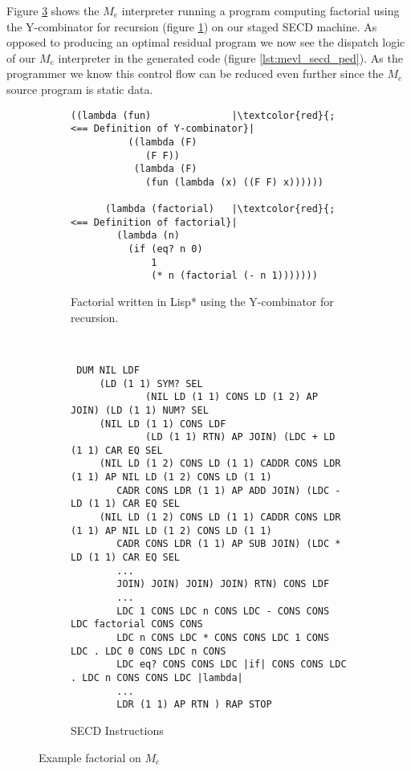 \documentclass[a4paper,12pt,twoside,openright]{report}
\theoremstyle{definition}
\newcommand{\mevl}{$M_{e}$}
\begin{document}
Figure \ref{lst:mevl_secd_all} shows the \mevl{} interpreter running a program computing factorial using the Y-combinator for recursion (figure \ref{lst:mevl_secd_lisp}) on our staged SECD machine. As opposed to producing an optimal residual program we now see the dispatch logic of our \mevl{} interpreter in the generated code (figure \ref{lst:mevl_secd_ped}). As the programmer we know this control flow can be reduced even further since the \mevl{} source program is static data.


\begin{figure}[htp!]
\centering
    \begin{subfigure}{.5\linewidth}
         \centering
         \begin{verbatim}
((lambda (fun)              |\textcolor{red}{;<== Definition of Y-combinator}|
          ((lambda (F)
             (F F))
           (lambda (F)
             (fun (lambda (x) ((F F) x))))))

      (lambda (factorial)   |\textcolor{red}{;<== Definition of factorial}|
        (lambda (n)
          (if (eq? n 0)
              1
              (* n (factorial (- n 1)))))))
         \end{verbatim}
         \caption{Factorial written in Lisp* using the Y-combinator for recursion.}
         \label{lst:mevl_secd_lisp}
    \end{subfigure}\\[1ex]
    \par\bigskip
    \begin{subfigure}{\linewidth}
         \centering
         \begin{verbatim}
 DUM NIL LDF
     (LD (1 1) SYM? SEL
             (NIL LD (1 1) CONS LD (1 2) AP JOIN) (LD (1 1) NUM? SEL
     (NIL LD (1 1) CONS LDF
             (LD (1 1) RTN) AP JOIN) (LDC + LD (1 1) CAR EQ SEL
     (NIL LD (1 2) CONS LD (1 1) CADDR CONS LDR (1 1) AP NIL LD (1 2) CONS LD (1 1)
        CADR CONS LDR (1 1) AP ADD JOIN) (LDC - LD (1 1) CAR EQ SEL
     (NIL LD (1 2) CONS LD (1 1) CADDR CONS LDR (1 1) AP NIL LD (1 2) CONS LD (1 1)
        CADR CONS LDR (1 1) AP SUB JOIN) (LDC * LD (1 1) CAR EQ SEL
        ...
        JOIN) JOIN) JOIN) JOIN) RTN) CONS LDF
        ...
        LDC 1 CONS LDC n CONS LDC - CONS CONS LDC factorial CONS CONS
        LDC n CONS LDC * CONS CONS LDC 1 CONS LDC . LDC 0 CONS LDC n CONS
        LDC eq? CONS CONS LDC |if| CONS CONS LDC . LDC n CONS CONS LDC |lambda|
        ...
        LDR (1 1) AP RTN ) RAP STOP
         \end{verbatim}
    \caption{SECD Instructions}
    \label{lst:mevl_secd_ops}
    \end{subfigure}
\caption{Example factorial on \mevl}
\label{lst:mevl_secd_all}
\end{figure}
\end{document}
